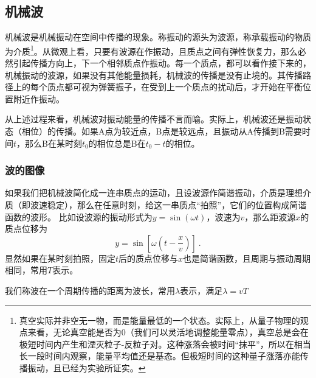 
\subsection{机械波}
机械波是机械振动在空间中传播的现象。称振动的源头为波源，称承载振动的物质为介质\footnote{真空实际并非空无一物，而是能量最低的一个状态。实际上，从量子物理的观点来看，无论真空能是否为0（我们可以灵活地调整能量零点），真空总是会在极短时间内产生和湮灭粒子-反粒子对。这种涨落会被时间“抹平”，所以在相当长一段时间内观察，能量平均值还是基态。但极短时间的这种量子涨落亦能传播振动，且已经为实验所证实。}。从微观上看，只要有波源在作振动，且质点之间有弹性恢复力，那么必然引起传播方向上，下一个相邻质点作振动。每一个质点，都可以看作接下来的，机械振动的波源，如果没有其他能量损耗，机械波的传播是没有止境的。其传播路径上的每个质点都可视为弹簧振子，在受到上一个质点的扰动后，才开始在平衡位置附近作振动。

从上述过程来看，机械波对振动能量的传播不言而喻。实际上，机械波还是振动状态（相位）的传播。如果A点为较近点，B点是较远点，且振动从A传播到B需要时间$t$，那么B在某时刻$t_0$的相位总是B在$t_0-t$的相位。
\subsubsection{波的图像}
如果我们把机械波简化成一连串质点的运动，且设波源作简谐振动，介质是理想介质（即波速稳定），那么在任意时刻，给这一串质点“拍照”，它们的位置构成简谐函数的波形。
比如设波源的振动形式为$y=\sin(\omega t)$，波速为$v$，那么距波源$x$的质点位移为
\begin{equation}
y=\sin [\omega (t-\frac{x}{v})]~.
\end{equation}
显然如果在某时刻拍照，固定$t$后的质点位移与$x$也是简谐函数，且周期与振动周期相同，常用$T$表示。

我们称波在一个周期传播的距离为波长，常用$\lambda $表示，满足$\lambda=vT$